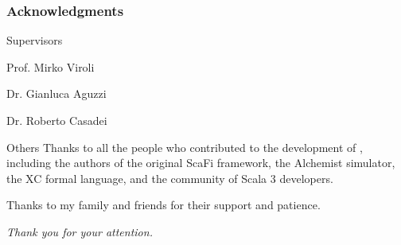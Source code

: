 \begin{frame}
    \frametitle{Acknowledgments}
    \begin{blockitems}{Supervisors}
        \item Prof. Mirko Viroli
        \item Dr. Gianluca Aguzzi
        \item Dr. Roberto Casadei
    \end{blockitems}
    \begin{block}{Others}
        Thanks to all the people who contributed to the development of \this, including the authors of the original ScaFi framework, the Alchemist simulator, the \ac{XC} formal language, and the community of Scala 3 developers.

        Thanks to my family and friends for their support and patience.

        \textit{Thank you for your attention.}
    \end{block}
\end{frame}
